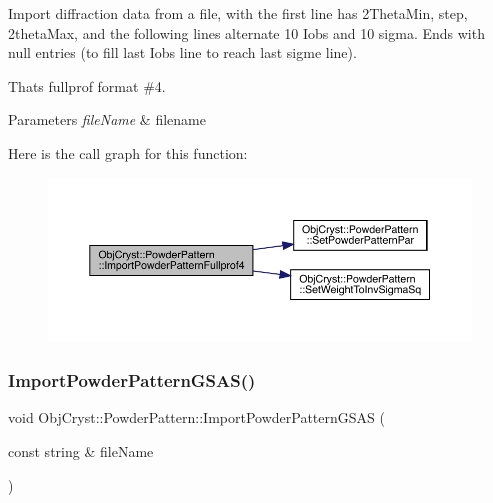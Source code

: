 Import diffraction data from a file, with the first line has 2Theta\+Min, step, 2theta\+Max, and the following lines alternate 10 Iobs and 10 sigma. Ends with null entries (to fill last Iobs line to reach last sigme line). 

That\textquotesingle{}s fullprof format \#4. 
\begin{DoxyParams}{Parameters}
{\em file\+Name} & filename \\
\hline
\end{DoxyParams}
Here is the call graph for this function\+:
\nopagebreak
\begin{figure}[H]
\begin{center}
\leavevmode
\includegraphics[width=350pt]{class_obj_cryst_1_1_powder_pattern_a272b9fd71a6925eb9e1a991e488259b4_cgraph}
\end{center}
\end{figure}
\mbox{\label{class_obj_cryst_1_1_powder_pattern_a78be27d8764377f99e324a7181eac633}} 
\subsubsection{\texorpdfstring{ImportPowderPatternGSAS()}{ImportPowderPatternGSAS()}}
{\footnotesize\ttfamily void Obj\+Cryst\+::\+Powder\+Pattern\+::\+Import\+Powder\+Pattern\+G\+S\+AS (\begin{DoxyParamCaption}\item[{const string \&}]{file\+Name }\end{DoxyParamCaption})}

